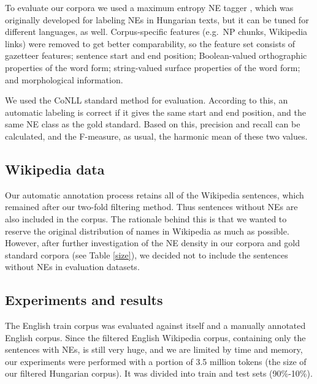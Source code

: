 \documentclass[11pt]{article}
\begin{document}
To evaluate our corpora we used a maximum entropy NE tagger \cite{Varga:07}, which was originally developed for labeling NEs in Hungarian texts, but it can be tuned for different languages, as well. Corpus-specific features (e.g.~NP chunks, Wikipedia links) were removed to get better comparability, so the feature set consists of gazetteer features; sentence start and end position; Boolean-valued orthographic properties of the word form; string-valued surface properties of the word form; and morphological information.


We used the CoNLL standard method for evaluation. According to this, an automatic labeling is correct if it gives the same start and end position, and the same NE class as the gold standard. Based on this, precision and recall can be calculated, and the F-measure, as usual, the harmonic mean of these two values.  

\subsection{Wikipedia data}

Our automatic annotation process retains all of the Wikipedia sentences, which remained after our two-fold filtering method. Thus sentences without NEs are also included in the corpus. The rationale behind this is that we wanted to reserve the original distribution of names in Wikipedia as much as possible. However, after further investigation of the NE density in our corpora and gold standard corpora (see Table \ref{size}), we decided not to include the sentences without NEs in evaluation datasets. 

\subsection{Experiments and results}

The English train corpus was evaluated against itself and a manually annotated English corpus. Since the filtered English Wikipedia corpus, containing only the sentences with NEs, is still very huge, and we are limited by time and memory, our experiments were performed with a portion of 3.5 million tokens (the size of our filtered Hungarian corpus). It was divided into train and test sets (90\%-10\%). 
\end{document}
